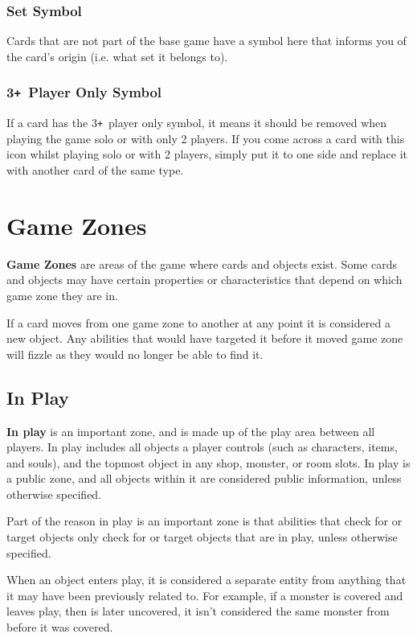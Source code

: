 \documentclass[
  fontsize=10pt,
  paper=a5,
  version=last,
  chapterprefix=true,
  bindingoffset=5mm,
  ]{scrbook}
\def\plus{\texttt{+}}
\begin{document}
    \subsection*{Set Symbol}
    Cards that are not part of the base game have a symbol here that informs you of the card’s origin (i.e. what set it belongs to).
    \subsection*{3\plus\ Player Only Symbol}
    If a card has the 3\plus\ player only symbol, it means it should be removed when playing the game solo or with only 2 players. If you come across a card with this icon whilst playing solo or with 2 players, simply put it to one side and replace it with another card of the same type.

    \chapter{Game Zones}
    \label{zones}
    \textbf{Game Zones} are areas of the game where cards and objects exist. Some cards and objects may have certain properties or characteristics that depend on which game zone they are in.

    If a card moves from one game zone to another at any point it is considered a new object. Any abilities that would have targeted it before it moved game zone will fizzle as they would no longer be able to find it.

    \section{In Play}
    \textbf{In play} is an important zone, and is made up of the play area between all players. In play includes all objects a player controls (such as characters, items, and souls), and the topmost object in any shop, monster, or room slots. In play is a public zone, and all objects within it are considered public information, unless otherwise specified.

    Part of the reason in play is an important zone is that abilities that check for or target objects only check for or target objects that are in play, unless otherwise specified.

    When an object enters play, it is considered a separate entity from anything that it may have been previously related to. For example, if a monster is covered and leaves play, then is later uncovered, it isn’t considered the same monster from before it was covered.
\end{document}
